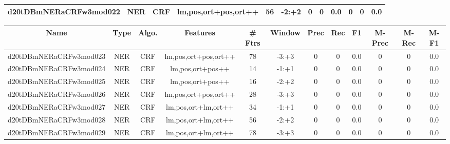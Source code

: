 \documentclass[a4paper]{article}
\begin{document}
\begin{landscape}
\begin{center}
\begin{tabular}{ |c|c|c|c|c|c|c|c|c|c|c|c|}
 
 	
 	\small{ d20tDBmNERaCRFw3mod022 } & \small{ NER} & \small{  CRF }  & lm,pos,ort+pos,ort++  &  56 &  \small{  -2:+2 }  &  0 & 0 & 0.0  &  0 & 0 & 0.0 \\
 	
 \hline
\end{tabular}
\end{center}




\begin{center}
\begin{tabular}{ |c|c|c|c|c|c|c|c|c|c|c|c|} 
 \hline
 	Name & Type & Algo. & Features & \# Ftrs & Window & Prec & Rec & F1 & M-Prec & M-Rec & M-F1\\
 \hline

 	

 
 	
 	\small{ d20tDBmNERaCRFw3mod023 } & \small{ NER} & \small{  CRF }  & lm,pos,ort+pos,ort++  &  78 &  \small{  -3:+3 }  &  0 & 0 & 0.0  &  0 & 0 & 0.0 \\
 	

 
 	
 	\small{ d20tDBmNERaCRFw3mod024 } & \small{ NER} & \small{  CRF }  & lm,pos,ort+pos++  &  14 &  \small{  -1:+1 }  &  0 & 0 & 0.0  &  0 & 0 & 0.0 \\
 	

 
 	
 	\small{ d20tDBmNERaCRFw3mod025 } & \small{ NER} & \small{  CRF }  & lm,pos,ort+pos++  &  16 &  \small{  -2:+2 }  &  0 & 0 & 0.0  &  0 & 0 & 0.0 \\
 	

 
 	
 	\small{ d20tDBmNERaCRFw3mod026 } & \small{ NER} & \small{  CRF }  & lm,pos,ort+pos,ort++  &  28 &  \small{  -3:+3 }  &  0 & 0 & 0.0  &  0 & 0 & 0.0 \\
 	

 
 	
 	\small{ d20tDBmNERaCRFw3mod027 } & \small{ NER} & \small{  CRF }  & lm,pos,ort+lm,ort++  &  34 &  \small{  -1:+1 }  &  0 & 0 & 0.0  &  0 & 0 & 0.0 \\
 	

 
 	
 	\small{ d20tDBmNERaCRFw3mod028 } & \small{ NER} & \small{  CRF }  & lm,pos,ort+lm,ort++  &  56 &  \small{  -2:+2 }  &  0 & 0 & 0.0  &  0 & 0 & 0.0 \\
 	

 
 	
 	\small{ d20tDBmNERaCRFw3mod029 } & \small{ NER} & \small{  CRF }  & lm,pos,ort+lm,ort++  &  78 &  \small{  -3:+3 }  &  0 & 0 & 0.0  &  0 & 0 & 0.0 \\
 	


\end{tabular}
\end{center}
\end{landscape}
\end{document}
